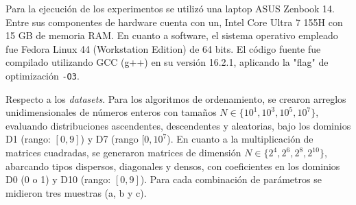 Para la ejecución de los experimentos se utilizó una laptop ASUS Zenbook 14. Entre sus componentes de hardware cuenta con un, Intel Core Ultra 7 155H con 15 GB de memoria RAM. En cuanto a software, el sistema operativo empleado fue Fedora Linux 44 (Workstation Edition) de 64 bits. El código fuente fue compilado utilizando GCC (g++) en su versión 16.2.1, aplicando la "flag" de optimización \texttt{-O3}.

Respecto a los \textit{datasets}. Para los algoritmos de ordenamiento, se crearon arreglos unidimensionales de números enteros con tamaños $N \in \{10^1, 10^3, 10^5, 10^7\}$, evaluando distribuciones ascendentes, descendentes y aleatorias, bajo los dominios D1 (rango: $[0,9]$) y D7 (rango $[0,10^{7}$). En cuanto a la multiplicación de matrices cuadradas, se generaron matrices de dimensión $N \in \{2^4, 2^6, 2^8, 2^{10}\}$, abarcando tipos dispersos, diagonales y densos, con coeficientes en los dominios D0 (0 o 1) y D10 (rango: $[0,9]$). Para cada combinación de parámetros se midieron tres muestras (a, b y c). 
